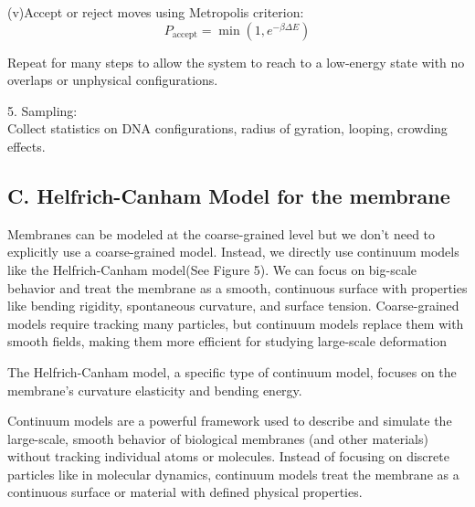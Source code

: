 \documentclass[12pt]{article}
\begin{document}
\begin{flushleft}
(v)Accept or reject moves using Metropolis criterion:
\begin{equation}
P_{\text{accept}} = \min \left(1, e^{-\beta \Delta E}\right)
\end{equation}

\setlength{\parindent}{0em}

\setlength{\parindent}{4em}
Repeat for many steps to allow the system to reach to a low-energy state with no overlaps or unphysical configurations.


\setlength{\parindent}{0em}

5. Sampling:\\
Collect statistics on DNA configurations, radius of gyration, looping, crowding effects.\\








\vspace{-1em} 
\subsection*{C. Helfrich-Canham Model for the membrane}
\setlength{\parindent}{30pt}

Membranes can be modeled at the coarse-grained level but we don't need to explicitly use a coarse-grained model. Instead, we directly use continuum models like the Helfrich-Canham model(See Figure 5). We can focus on big-scale behavior and treat the membrane as a smooth, continuous surface with properties like bending rigidity, spontaneous curvature, and surface tension. Coarse-grained models require tracking many particles, but continuum models replace them with smooth fields, making them more efficient for studying large-scale deformation








\setlength{\parindent}{30pt}
The Helfrich-Canham model, a specific type of continuum model, focuses on the membrane's curvature elasticity and bending energy\cite{Bassereau2014}.






Continuum models are a powerful framework used to describe and simulate the large-scale, smooth behavior of biological membranes (and other materials) without tracking individual atoms or molecules. Instead of focusing on discrete particles like in molecular dynamics, continuum models treat the membrane as a continuous surface or material with defined physical properties.




\end{flushleft}
\end{document}
